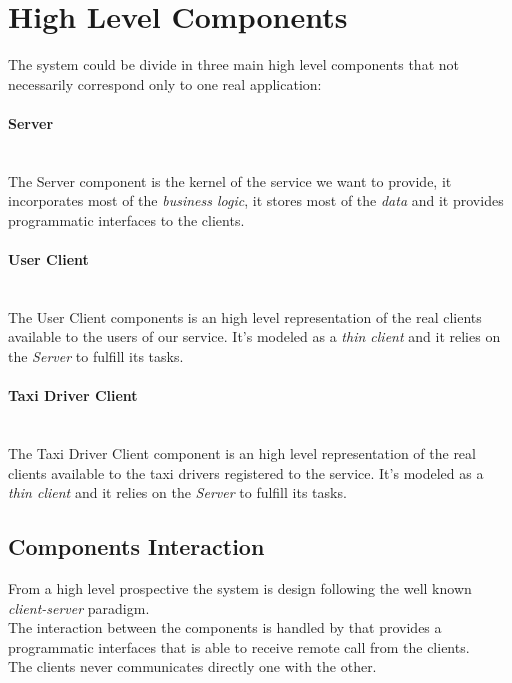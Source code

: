 \section{High Level Components} %
\label{sec:high_level_components}
The system could be divide in three main high level components that not necessarily correspond only to one real application:
\paragraph{Server} %
\label{comp:server}\hfill \\
The Server component is the kernel of the service we want to provide, it incorporates most of the \emph{business logic}, it stores most of the \emph{data} and it provides programmatic interfaces to the clients.
\paragraph{User Client} %
\label{comp:user_client}\hfill \\
The User Client components is an high level representation of the real clients available to the users of our service. It's modeled as a \emph{thin client} and it relies on the \emph{Server} to fulfill its tasks.
\paragraph{Taxi Driver Client} %
\label{par:taxi_driver_client}\hfill \\
The Taxi Driver Client component is an high level representation of the real clients available to the taxi drivers registered to the service. It's modeled as a \emph{thin client} and it relies on the \emph{Server} to fulfill its tasks.


\subsection{Components Interaction} %
\label{sub:components_interaction}
From a high level prospective the system is design following the well known \emph{client-server} paradigm.\\
The interaction between the components is handled by  that provides a programmatic interfaces that is able to receive remote call from the clients.\\
The clients never communicates directly one with the other.








